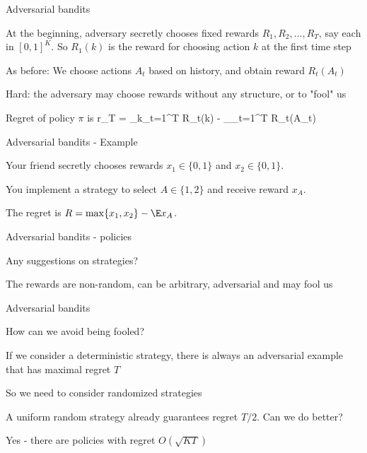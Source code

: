 \documentclass[english]{article}
\begin{document}
\benum

\item {Adversarial bandits}
\bitem
\item At the beginning, adversary secretly chooses fixed rewards $R_1,R_2,\ldots,R_T$, say each in $[0,1]^K$. So $R_1(k)$ is the reward for choosing action $k$ at the first time step
\item As before: We choose actions $A_t$ based on history, and obtain reward $R_t(A_t)$
\item Hard: the adversary may choose rewards without any structure, or to "fool" us
\item Regret of policy $\pi$ is
\beqs
r_T = \max_k\sum_{t=1}^T R_{t}(k) - \E_{\pi}\sum_{t=1}^T R_t(A_t)
\eeqs

\eitem



\item {Adversarial bandits - Example}
\bitem
\item Your friend secretly chooses rewards $x_1 \in \{0,1\}$ and $x_2\in \{0,1\}$.
\item You implement a strategy to select $A \in \{1,2\}$ and receive reward $x_ A$.
\item The regret is $R = \max\{x_1 ,x_2\}- \E x_A$.
\eitem






\item {Adversarial bandits - policies}
\bitem
\item Any suggestions on strategies?
\item The rewards are non-random, can be arbitrary, adversarial and may fool us
\eitem




\item {Adversarial bandits}
\bitem
\item How can we avoid being fooled?
\item If we consider a deterministic strategy, there is always an adversarial example that has maximal regret $T$
\item So we need to consider randomized strategies
\item A uniform random strategy already guarantees regret $T/2$. Can we do better?
\item Yes - there are policies with regret $O(\sqrt{KT})$
\eitem
\end{document}
